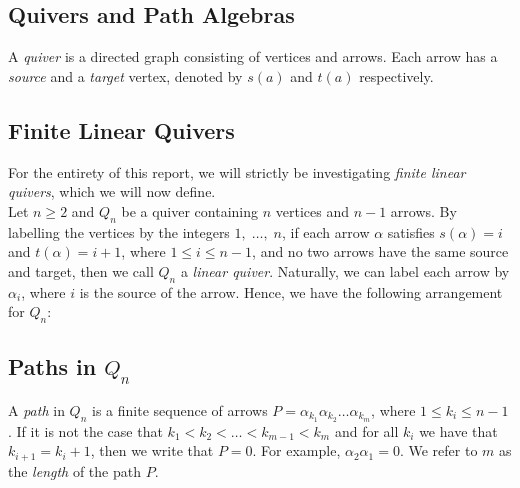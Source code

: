 \documentclass{article}
\begin{document}
\begin{flushleft}
   \section{Quivers and Path Algebras}
   A \textit{quiver} is a directed graph consisting of vertices and arrows. Each arrow has 
   a \textit{source} and a \textit{target} vertex, denoted by $s(a)$ and $t(a)$ respectively.
   \\[\baselineskip]
   \subsection{Finite Linear Quivers}
   For the entirety of this report, we will strictly be investigating \textit{finite linear quivers}, which
   we will now define. \\[\baselineskip]
   Let $n \geq 2$ and $Q_n$ be a quiver containing $n$ vertices and $n-1$ arrows. By labelling the vertices
   by the integers $1,\; \ldots, \; n$, if each arrow $\alpha$ satisfies $s(\alpha) = i$ and 
   $t(\alpha) = i+1$, where $1 \leq i \leq n-1$, and no two arrows have the same source and target, then
   we call $Q_n$ a \textit{linear quiver}. 
   Naturally, we can label each arrow by $\alpha_i$, where $i$ is the source
   of the arrow. Hence, we have the following arrangement for $Q_n$:

   \begin{center}
   \end{center}

   \subsection{Paths in $Q_n$}
   A \textit{path} in $Q_n$ is a finite sequence of arrows $P = \alpha_{k_1}\alpha_{k_2}\ldots\alpha_{k_m}$, 
   where $1 \leq k_i \leq n-1$. If it is not the case that $k_1 < k_2 < \ldots < k_{m-1} < k_m$ and 
   for all $k_i$ we have that $k_{i+1} = k_i + 1$, then
   we write that $P = 0$. For example, $\alpha_2\alpha_1 = 0$. We refer to $m$ as the \textit{length} of 
   the path $P$.


\end{flushleft}
\end{document}
